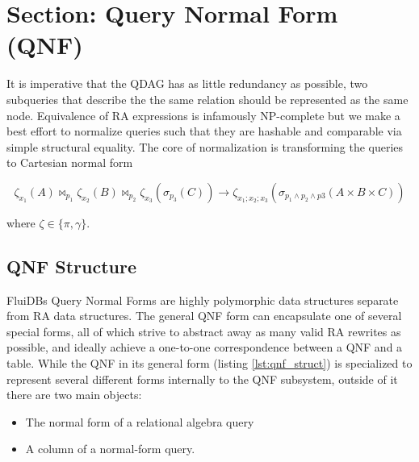 \section{Section: Query Normal Form (QNF)}
\label{sec:qnf}

It is imperative that the QDAG has as little redundancy as possible,
two subqueries that describe the the same relation should be
represented as the same node. Equivalence of RA expressions is
infamously NP-complete
\cite{sagivEquivalencesRelationalExpressions1980} but we make a best
effort to normalize queries such that they are hashable and comparable
via simple structural equality. The core of normalization is
transforming the queries to Cartesian normal form

\[
  \zeta_{x_1}(A) \Join_{p_1} \zeta_{x_2}(B) \Join_{p_2} \zeta_{x_3} (\sigma_{p_3}(C)) \to \zeta_{x_1;x_2;x_3}(\sigma_{p_1 \land p_2 \land p3}(A \times B \times C))
\]

where \(\zeta \in \{\pi,\gamma\}\).

\subsection{QNF Structure}

FluiDBs Query Normal Forms are highly polymorphic data structures separate from
RA data structures. The general QNF form can encapsulate one
of several special forms, all of which strive to abstract away as many
valid RA rewrites as possible, and ideally achieve a one-to-one correspondence
between a QNF and a table. While the QNF in its general form (listing
\ref{lst:qnf_struct}) is specialized to represent several different forms
internally to the QNF subsystem, outside of it there are two main
objects:

\begin{itemize}
\item The normal form of a relational algebra query
\item A column of a normal-form query.
\end{itemize}

